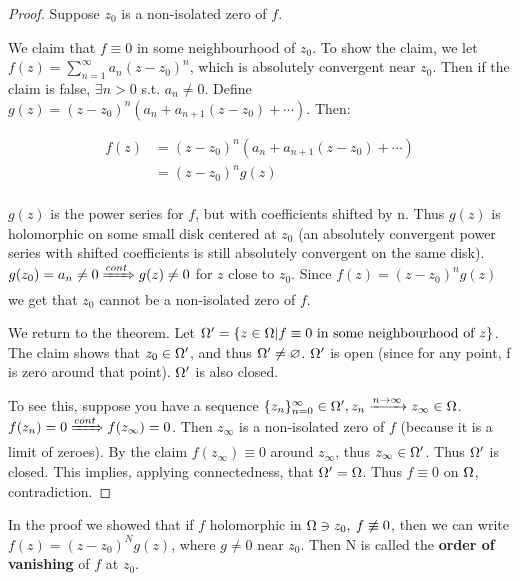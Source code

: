 \begin{proof}
Suppose $z_0$ is a non-isolated zero of $f$.

We claim that $f\equiv 0$ in some neighbourhood of $z_0$. To show the claim, we let $f(z) = \sum_{n=1}^{\infty} a_n (z-z_0)^n$, which is absolutely convergent near $z_0$. Then if the claim is false, $\exists n >0$ s.t. $a_n\neq 0$. Define $g(z) = (z-z_0)^n(a_n+a_{n+1}(z-z_0) + \cdots )$. Then:

\begin{align*}
    f(z) &= (z-z_0)^n(a_n+a_{n+1}(z-z_0) + \cdots )\\
    &= (z-z_0)^ng(z)\\
\end{align*}

$g(z)$ is the power series for $f$, but with coefficients shifted by n. Thus $g(z)$ is holomorphic on some small disk centered at $z_0$ (an absolutely convergent power series with shifted coefficients is still absolutely convergent on the same disk). $g(z_0) = a_n \neq 0 \xRightarrow[]{cont} g(z) \neq 0$ for $z$ close to $z_0$. Since $f(z) = (z-z_0)^ng(z)$ we get that $z_0$ cannot be a non-isolated zero of $f$.

We return to the theorem. Let $\Omega ' = \{ z \in \Omega | f \equiv 0 \text{ in some neighbourhood of } z \}$. The claim shows that $z_0 \in \Omega '$, and thus $\Omega ' \neq \varnothing$. $\Omega '$ is open (since for any point, f is zero around that point). $\Omega '$ is also closed.

To see this, suppose you have a sequence $\{ z_n \}_{n=0}^\infty \in \Omega ', z_n \xrightarrow[]{n\to \infty} z_\infty \in \Omega $. $f(z_n) = 0 \xRightarrow[]{cont} f(z_\infty) = 0$. Then $z_\infty$ is a non-isolated zero of $f$ (because it is a limit of zeroes). By the claim $f(z_\infty) \equiv 0 $ around $z_\infty$, thus $z_\infty \in \Omega '$. Thus $\Omega '$ is closed. This implies, applying connectedness, that $\Omega ' = \Omega$. Thus $f \equiv 0$ on $\Omega$, contradiction.

\end{proof} 


\begin{definition}
In the proof we showed that if $f$ holomorphic in $\Omega \ni z_0, \: f \not\equiv 0$, then we can write $f(z) = (z-z_0)^N g(z)$, where $g \neq 0$ near $z_0$. Then N is called the \textbf{order of vanishing} of $f$ at $z_0$.



\end{definition}

